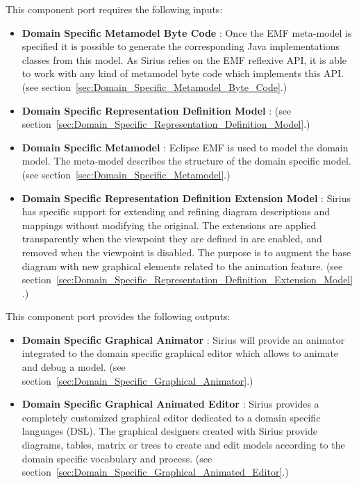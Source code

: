 \documentclass{gemoc} %
\begin{document}
This component port requires the following inputs:
\begin{itemize}
  \item \textbf{Domain Specific Metamodel Byte Code} :
Once the EMF meta-model is specified it is possible to generate the corresponding Java implementations classes from this model. As Sirius relies on the EMF reflexive API, it is able to work with any kind of metamodel byte code which implements this API.
(see section~\ref{sec:Domain_Specific_Metamodel_Byte_Code}.)
  \item \textbf{Domain Specific Representation Definition Model} :
(see section~\ref{sec:Domain_Specific_Representation_Definition_Model}.)
  \item \textbf{Domain Specific Metamodel} :
Eclipse EMF is used to model the domain model. The meta-model describes the structure of the domain specific model.
(see section~\ref{sec:Domain_Specific_Metamodel}.)
  \item \textbf{Domain Specific Representation Definition Extension Model} :
Sirius has specific support for extending and refining diagram descriptions and mappings without modifying the original. The extensions are applied transparently when the viewpoint they are defined in are enabled, and removed when the viewpoint is disabled.  The purpose is to augment the base diagram with new graphical elements related to the animation feature.
(see section~\ref{sec:Domain_Specific_Representation_Definition_Extension_Model}.)
\end{itemize}

This component port provides the following outputs:
\begin{itemize}
  \item \textbf{Domain Specific Graphical Animator} :
Sirius will provide an animator integrated to the domain specific graphical editor which allows to animate and debug a model. 
(see section~\ref{sec:Domain_Specific_Graphical_Animator}.)
  \item \textbf{Domain Specific Graphical Animated Editor} :
Sirius provides a completely customized graphical editor dedicated to a domain specific languages (DSL). The graphical designers created with Sirius provide diagrams, tables, matrix or trees to create and edit models according to the domain specific vocabulary and process.
(see section~\ref{sec:Domain_Specific_Graphical_Animated_Editor}.)
\end{itemize}
\end{document}
